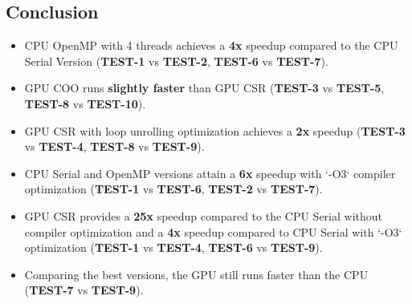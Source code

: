 \documentclass[12pt]{article}
\begin{document}
\subsection{Conclusion}
\begin{itemize}
    \item CPU OpenMP with 4 threads achieves a \textbf{4x} speedup compared to the CPU Serial Version (\textbf{TEST-1} vs \textbf{TEST-2}, \textbf{TEST-6} vs \textbf{TEST-7}).
    \item GPU COO runs \textbf{slightly faster} than GPU CSR (\textbf{TEST-3} vs \textbf{TEST-5}, \textbf{TEST-8} vs \textbf{TEST-10}).
    \item GPU CSR with loop unrolling optimization achieves a \textbf{2x} speedup (\textbf{TEST-3} vs \textbf{TEST-4}, \textbf{TEST-8} vs \textbf{TEST-9}).
    \item CPU Serial and OpenMP versions attain a \textbf{6x} speedup with `-O3` compiler optimization (\textbf{TEST-1} vs \textbf{TEST-6}, \textbf{TEST-2} vs \textbf{TEST-7}).
    \item GPU CSR provides a \textbf{25x} speedup compared to the CPU Serial without compiler optimization and a \textbf{4x} speedup compared to CPU Serial with `-O3` optimization (\textbf{TEST-1} vs \textbf{TEST-4}, \textbf{TEST-6} vs \textbf{TEST-9}).
    \item Comparing the best versions, the GPU still runs faster than the CPU (\textbf{TEST-7} vs \textbf{TEST-9}).
\end{itemize}
\end{document}
